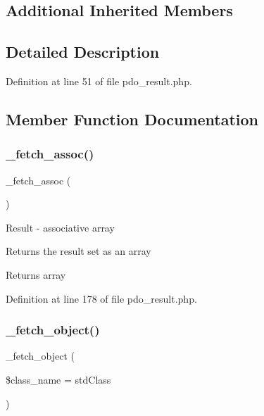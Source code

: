 \subsection*{Additional Inherited Members}


\subsection{Detailed Description}


Definition at line 51 of file pdo\+\_\+result.\+php.



\subsection{Member Function Documentation}
\mbox{\label{class_c_i___d_b__pdo__result_a43a9a92817f1334a1c10752ec44275a0}} 
\subsubsection{\texorpdfstring{\_fetch\_assoc()}{\_fetch\_assoc()}}
{\footnotesize\ttfamily \+\_\+fetch\+\_\+assoc (\begin{DoxyParamCaption}{ }\end{DoxyParamCaption})\hspace{0.3cm}{\ttfamily [protected]}}

Result -\/ associative array

Returns the result set as an array

\begin{DoxyReturn}{Returns}
array 
\end{DoxyReturn}


Definition at line 178 of file pdo\+\_\+result.\+php.

\mbox{\label{class_c_i___d_b__pdo__result_a60806be6a9c2488820813c2a7f4fef71}} 
\subsubsection{\texorpdfstring{\_fetch\_object()}{\_fetch\_object()}}
{\footnotesize\ttfamily \+\_\+fetch\+\_\+object (\begin{DoxyParamCaption}\item[{}]{\$class\+\_\+name = {\ttfamily \textquotesingle{}stdClass\textquotesingle{}} }\end{DoxyParamCaption})\hspace{0.3cm}{\ttfamily [protected]}}

